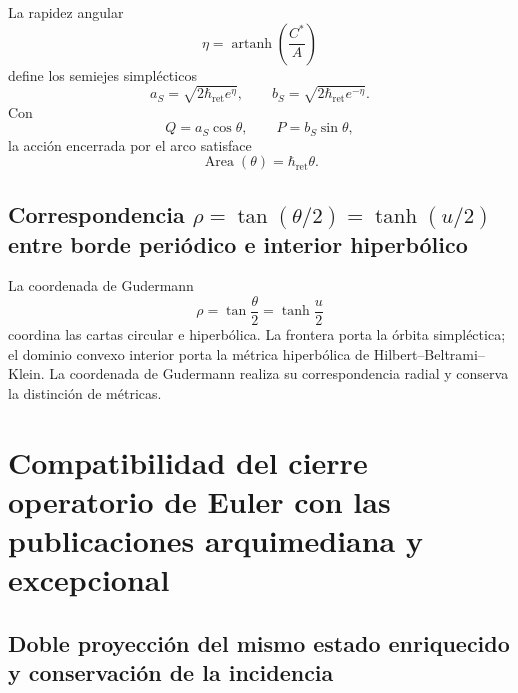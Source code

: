 La rapidez angular
\begin{equation}
 \eta=\operatorname{artanh}\!\left(\frac{C^*}{A}\right)
 \label{eq:l9s102:euler-rapidez}
\end{equation}
define los semiejes simplécticos
\begin{equation}
 a_S=\sqrt{2\hbar_{\mathrm{ret}}e^\eta},
 \qquad
 b_S=\sqrt{2\hbar_{\mathrm{ret}}e^{-\eta}}.
 \label{eq:l9s102:euler-semiejes}
\end{equation}
Con
\begin{equation}
 Q=a_S\cos\theta,
 \qquad
 P=b_S\sin\theta,
 \label{eq:l9s102:euler-qp}
\end{equation}
la acción encerrada por el arco satisface
\begin{equation}
 \boxed{\operatorname{Area}(\theta)=\hbar_{\mathrm{ret}}\theta.}
 \label{eq:l9s102:euler-area-accion}
\end{equation}

\subsection{Correspondencia \texorpdfstring{\(\rho=\tan(\theta/2)=\tanh(u/2)\)}{rho=tan(theta/2)=tanh(u/2)} entre borde periódico e interior hiperbólico}

La coordenada de Gudermann
\begin{equation}
 \rho=\tan\frac\theta2=\tanh\frac u2
 \label{eq:l9s102:euler-gudermann}
\end{equation}
coordina las cartas circular e hiperbólica.
La frontera porta la órbita simpléctica; el dominio convexo interior porta
la métrica hiperbólica de Hilbert--Beltrami--Klein. La coordenada de
Gudermann realiza su correspondencia radial y conserva la distinción de
métricas.

\section{Compatibilidad del cierre operatorio de Euler con las publicaciones arquimediana y excepcional}
\label{sec:l9s102:euler-doble-proyeccion}

\subsection{Doble proyección del mismo estado enriquecido y conservación de la incidencia}

